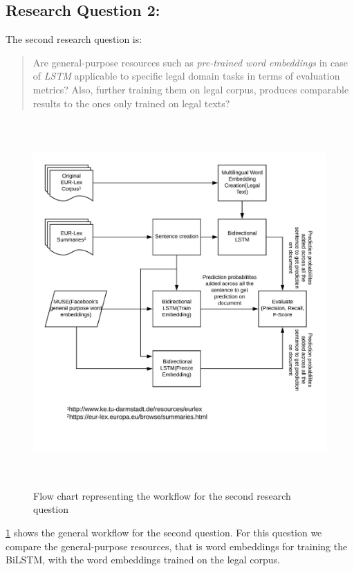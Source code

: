 \subsection{Research Question 2:} \label{question2}
The second research question is:

\begin{quote}
    Are general-purpose resources such as \textit{pre-trained word embeddings} in case of \textit{LSTM} applicable to specific legal domain tasks in terms of evaluation metrics? Also, further training them on legal corpus, produces comparable results to the ones only trained on legal texts?
\end{quote}

\begin{figure}[!ht]
    \centering
    \includegraphics[width=15cm, height=14cm,keepaspectratio]{pics/flowforQuestion2.jpeg}
    \caption{Flow chart representing the workflow for the second research question}
    \label{fig:FlowResearchQuestion2}
\end{figure}

\ref{fig:FlowResearchQuestion2} shows the general workflow for the second question. For this question we compare the general-purpose resources, that is word embeddings for training the \gls{BiLSTM}, with the word embeddings trained on the legal corpus. 

